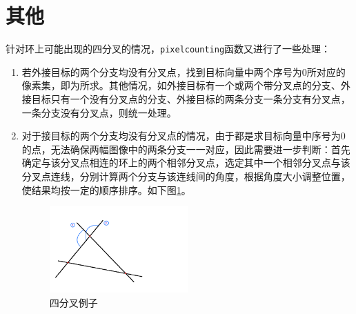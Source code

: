 \documentclass[12pt]{article}
\begin{document}
\section{其他}
针对环上可能出现的四分叉的情况，\verb|pixelcounting|函数又进行了一些处理：
\begin{enumerate}
\item 若外接目标的两个分支均没有分叉点，找到目标向量中两个序号为0所对应的像素集，即为所求。其他情况，如外接目标有一个或两个带分叉点的分支、外接目标只有一个没有分叉点的分支、外接目标的两条分支一条分支有分叉点，一条分支没有分叉点，则统一处理。
\item 对于接目标的两个分支均没有分叉点的情况，由于都是求目标向量中序号为0的点，无法确保两幅图像中的两条分支一一对应，因此需要进一步判断：首先确定与该分叉点相连的环上的两个相邻分叉点，选定其中一个相邻分叉点与该分叉点连线，分别计算两个分支与该连线间的角度，根据角度大小调整位置，使结果均按一定的顺序排序。如下图\ref{fig:四分叉}。
\begin{figure}[ht]
\centering
\includegraphics[width=0.5\textwidth]{images/四分叉}
\caption{四分叉例子}
\label{fig:四分叉}
\end{figure}
\end{enumerate}



\end{document}
